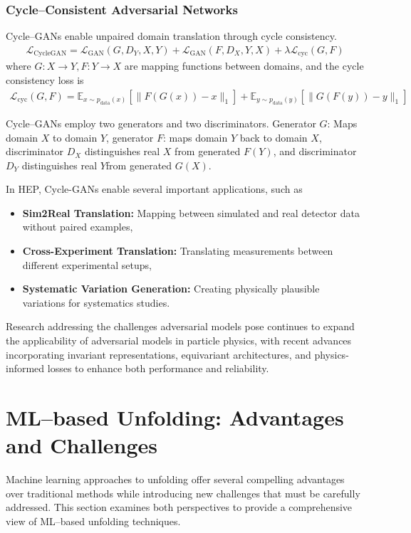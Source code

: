     \subsubsection{Cycle--Consistent Adversarial Networks}
        Cycle--GANs enable unpaired domain translation through cycle consistency.
        \begin{gather}
            \mathcal{L}_{\text{CycleGAN}} = \mathcal{L}_{\text{GAN}}(G, D_Y, X, Y) + \mathcal{L}_{\text{GAN}}(F, D_X, Y, X) + \lambda \mathcal{L}_{\text{cyc}}(G, F)
        \end{gather}
        where \(G: X \rightarrow Y, F: Y \rightarrow X\) are mapping functions between domains, and the cycle consistency loss is
        \begin{gather}
            \mathcal{L}_{\text{cyc}}(G, F) = \mathbb{E}_{x \sim p_{\text{data}}(x)}[\|F(G(x)) - x\|_1] + \mathbb{E}_{y \sim p_{\text{data}}(y)}[\|G(F(y)) - y\|_1]
        \end{gather}
        
        Cycle--GANs employ two generators and two discriminators.
        Generator \(G\): Maps domain \(X\) to domain \(Y\), generator \(F\): maps domain \(Y\) back to domain \(X\), discriminator \(D_X\) distinguishes real \(X\) from generated \(F(Y)\), and discriminator \(D_Y\) distinguishes real \(Y\)from generated \(G(X)\).
        

        In HEP, Cycle-GANs enable several important applications, such as
        \begin{itemize}
            \item \textbf{Sim2Real Translation:} Mapping between simulated and real detector data without paired examples,
            \item \textbf{Cross-Experiment Translation:} Translating measurements between different experimental setups,
            \item \textbf{Systematic Variation Generation:} Creating physically plausible variations for systematics studies.
        \end{itemize}
    Research addressing the challenges adversarial models pose continues to expand the applicability of adversarial models in particle physics, with recent advances incorporating invariant representations, equivariant architectures, and physics-informed losses to enhance both performance and reliability.
\section{ML--based Unfolding: Advantages and Challenges}
Machine learning approaches to unfolding offer several compelling advantages over traditional methods while introducing new challenges that must be carefully addressed.
%
This section examines both perspectives to provide a comprehensive view of ML--based unfolding techniques.
